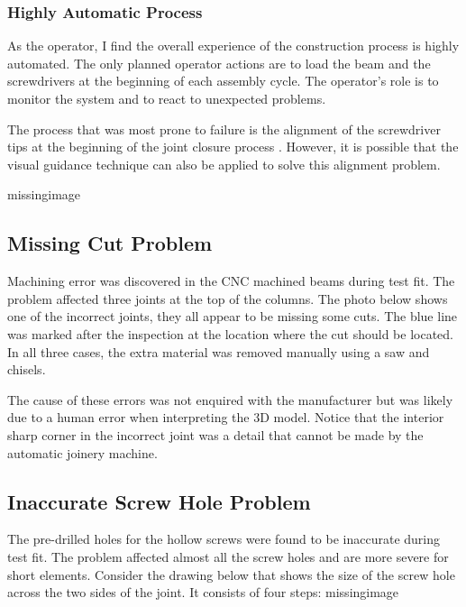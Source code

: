 \subsubsection{Highly Automatic Process}
\label{subsubsection:exploration-4-highly-automatic-process}

As the operator, I find the overall experience of the construction process is highly automated. The only planned operator actions are to load the beam and the screwdrivers at the beginning of each assembly cycle. The operator’s role is to monitor the system and to react to unexpected problems.

The process that was most prone to failure is the alignment of the screwdriver tips at the beginning of the joint closure process . However, it is possible that the visual guidance technique can also be applied to solve this alignment problem. 

missingimage

\subsection{Missing Cut Problem}
\label{subsection:exploration-4-missing-cut-problem}

Machining error was discovered in the CNC machined beams during test fit. The problem affected three joints at the top of the columns. The photo below shows one of the incorrect joints, they all appear to be missing some cuts. The blue line was marked after the inspection at the location where the cut should be located. In all three cases, the extra material was removed manually using a saw and chisels. 

The cause of these errors was not enquired with the manufacturer but was likely due to a human error when interpreting the 3D model. Notice that the interior sharp corner in the incorrect joint was a detail that cannot be made by the automatic joinery machine. 

\subsection{Inaccurate Screw Hole Problem}
\label{subsection:exploration-4-inaccurate-screw-hole-problem}

The pre-drilled holes for the hollow screws were found to be inaccurate during test fit. The problem affected almost all the screw holes and are more severe for short elements.
Consider the drawing below that shows the size of the screw hole across the two sides of the joint. It consists of four steps:
missingimage

